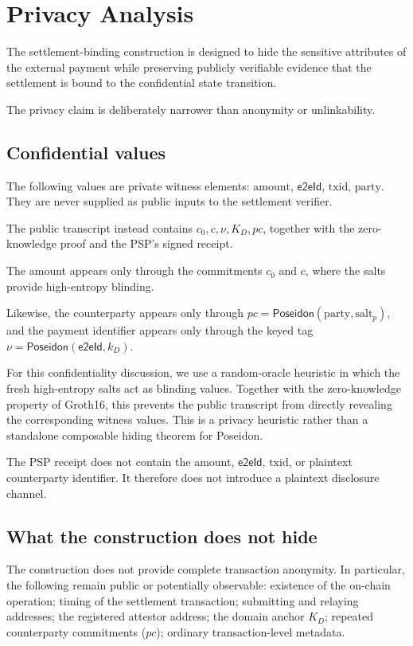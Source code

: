 \documentclass[10pt,twocolumn]{article}
\newcommand{\Poseidon}{\ensuremath{\mathsf{Poseidon}}}
\newcommand{\eeid}{\ensuremath{\mathsf{e2eId}}}
\newcommand{\amount}{\ensuremath{\text{amount}}}
\newcommand{\txid}{\ensuremath{\text{txid}}}
\newcommand{\party}{\ensuremath{\text{party}}}
\newcommand{\salt}{\ensuremath{\text{salt}}}
\newcommand{\pc}{\ensuremath{\mathit{pc}}}
\begin{document}
\section{Privacy Analysis}
\label{sec:privacy}

The settlement-binding construction is designed to hide the sensitive
attributes of the external payment while preserving publicly verifiable
evidence that the settlement is bound to the confidential state
transition.

The privacy claim is deliberately narrower than anonymity or
unlinkability.

\subsection{Confidential values}

The following values are private witness elements: \amount, \eeid,
\txid, \party. They are never supplied as public inputs to the
settlement verifier.

The public transcript instead contains $c_0,c,\nu,K_D,\pc$, together with
the zero-knowledge proof and the PSP's signed receipt.

The amount appears only through the commitments $c_0$ and $c$, where the
salts provide high-entropy blinding.

Likewise, the counterparty appears only through
$\pc=\Poseidon(\party,\salt_p)$, and the payment identifier appears only
through the keyed tag $\nu=\Poseidon(\eeid,k_D)$.

For this confidentiality discussion, we use a random-oracle heuristic in
which the fresh high-entropy salts act as blinding values. Together with
the zero-knowledge property of Groth16, this prevents the public
transcript from directly revealing the corresponding witness values. This
is a privacy heuristic rather than a standalone composable hiding theorem
for Poseidon.

The PSP receipt does not contain the amount, \eeid, \txid, or plaintext
counterparty identifier. It therefore does not introduce a plaintext
disclosure channel.

\subsection{What the construction does not hide}

The construction does not provide complete transaction anonymity. In
particular, the following remain public or potentially observable:
existence of the on-chain operation; timing of the settlement
transaction; submitting and relaying addresses; the registered attestor
address; the domain anchor $K_D$; repeated counterparty commitments
(\pc); ordinary transaction-level metadata.
\end{document}
